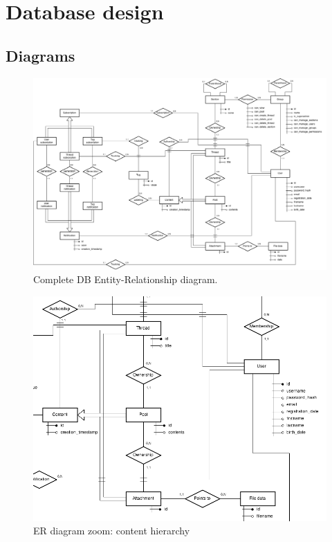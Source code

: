 \documentclass[12pt]{report}
\begin{document}
        \chapter{Database design}
            \section{Diagrams}

                \begin{figure}[!htb]
                \caption{Complete DB Entity-Relationship diagram.}
                \centering
                \includegraphics[width=1\textwidth]{erdiag}
                \end{figure}

                \begin{figure}[!htb]
                \caption{ER diagram zoom: content hierarchy}
                \centering
                \includegraphics[width=1\textwidth]{erzm0}
                \end{figure}
\end{document}
